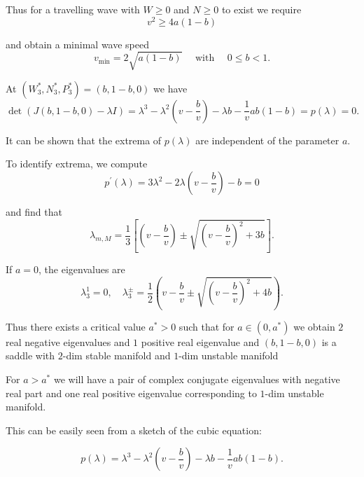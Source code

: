 \documentclass[
  letterpaper,
  DIV=11,
  numbers=noendperiod]{scrreprt}
\theoremstyle{plain}
\theoremstyle{definition}
\theoremstyle{plain}
\theoremstyle{remark}
\begin{document}
Thus for a travelling wave with \(W\geq 0\) and \(N \geq 0\) to exist we
require \[
v^2 \geq  4 a(1-b)
\]

and obtain a minimal wave speed \[
v_\text{min}=2\sqrt{a(1-b)}   \quad \text{ with } \quad  0\leq b<1.
\]

At \((W^\ast_3, N^\ast_3, P^\ast_3) =(b, 1-b, 0)\) we have \[
\det(J(b,1-b,0) - \lambda I)= \lambda^3 - \lambda^2(v- \frac b v) - \lambda b - \frac 1 v ab(1-b) = p(\lambda) =0.
\]

It can be shown that the extrema of \(p(\lambda)\) are independent of
the parameter \(a\).

To identify extrema, we compute \[
p^\prime(\lambda) = 3 \lambda^2 - 2 \lambda \left( v - \frac b v\right) - b = 0
\]

and find that \[
\lambda_{m,M}= \frac 13 \left[ \left(v - \frac bv \right) \pm \sqrt{ \left(v - \frac bv\right) ^2 + 3 b } \right].
\]

If \(a=0\), the eigenvalues are \[
\lambda_3^1 = 0, \quad \lambda_3^\pm = \frac 12 \left( v - \frac bv \pm \sqrt{\left(v - \frac bv\right)^2 + 4 b} \right).
\]

Thus there exists a critical value \(a^\ast>0\) such that for
\(a \in (0, a^\ast)\) we obtain \(2\) real negative eigenvalues and
\(1\) positive real eigenvalue and \((b, 1-b, 0)\) is a saddle with
\(2\)-dim stable manifold and \(1\)-dim unstable manifold

For \(a>a^\ast\) we will have a pair of complex conjugate eigenvalues
with negative real part and one real positive eigenvalue corresponding
to \(1\)-dim unstable manifold.

This can be easily seen from a sketch of the cubic equation:

\[
p(\lambda) = \lambda^3 - \lambda^2(v- \frac b v) - \lambda b - \frac 1 v ab(1-b).
\]
\end{document}
